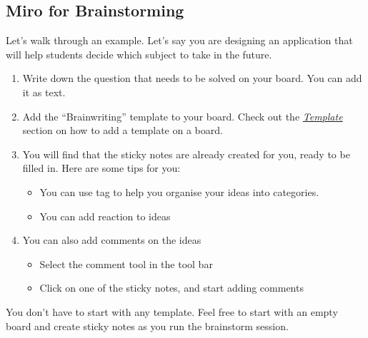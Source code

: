 \documentclass[letterpaper,10pt,english]{jupyterBook}
\begin{document}
\subsection{Miro for Brainstorming}
\label{\detokenize{appendices/appendix_d/miro_guide:miro-for-brainstorming}}
\sphinxAtStartPar
Let’s walk through an example. Let’s say you are designing an application that will help students decide which
subject to take in the future.
\begin{enumerate}
%
\item {} 
\sphinxAtStartPar
Write down the question that needs to be solved on your board. You can add it as text.

\item {} 
\sphinxAtStartPar
Add the “Brainwriting” template to your board. Check out the {\hyperref[\detokenize{appendices/appendix_d/miro_guide:template}]{\emph{Template}}} section on how to add a
template on a board.

\item {} 
\sphinxAtStartPar
You will find that the sticky notes are already created for you, ready to be filled in. Here are some tips
for you:
\begin{itemize}
\item {} 
\sphinxAtStartPar
You can use tag to help you organise your ideas into categories.

\item {} 
\sphinxAtStartPar
You can add reaction to ideas

\end{itemize}

\item {} 
\sphinxAtStartPar
You can also add comments on the ideas
\begin{itemize}
\item {} 
\sphinxAtStartPar
Select the comment tool in the tool bar

\item {} 
\sphinxAtStartPar
Click on one of the sticky notes, and start adding comments

\end{itemize}

\end{enumerate}

\sphinxAtStartPar
You don’t have to start with any template. Feel free to start with an empty board and create sticky notes as you
run the brainstorm session.
\end{document}
